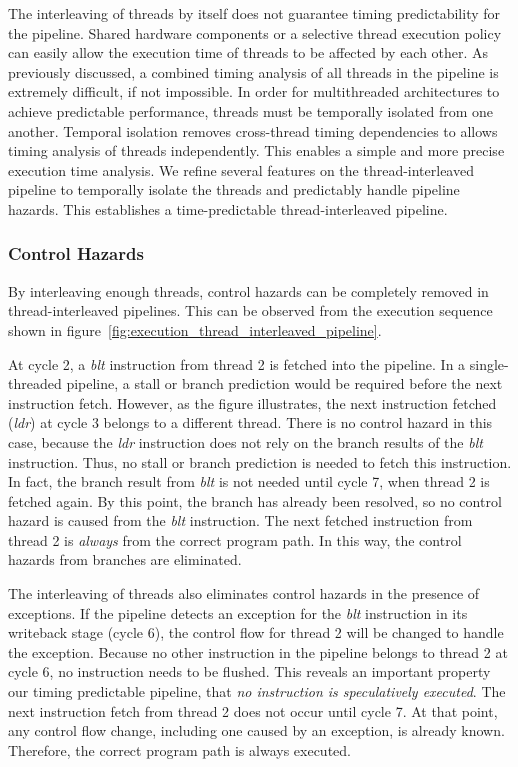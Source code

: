 The interleaving of threads by itself does not guarantee timing predictability for the pipeline.  
Shared hardware components or a selective thread execution policy can easily allow the execution time of threads to be affected by each other.    
As previously discussed, a combined timing analysis of all threads in the pipeline is extremely difficult, if not impossible.
In order for multithreaded architectures to achieve predictable performance, threads must be temporally isolated from one another. 
Temporal isolation removes cross-thread timing dependencies to allows timing analysis of threads independently.
This enables a simple and more precise execution time analysis.  
We refine several features on the thread-interleaved pipeline to temporally isolate the threads and predictably handle pipeline hazards.
This establishes a time-predictable thread-interleaved pipeline.

\subsubsection{Control Hazards}
By interleaving enough threads, control hazards can be completely removed in thread-interleaved pipelines.
This can be observed from the execution sequence shown in figure~\ref{fig:execution_thread_interleaved_pipeline}.

At cycle 2, a \emph{blt} instruction from thread 2 is fetched into the pipeline.
In a single-threaded pipeline, a stall or branch prediction would be required before the next instruction fetch.
However, as the figure illustrates, the next instruction fetched (\emph{ldr}) at cycle 3 belongs to a different thread.
There is no control hazard in this case, because the \emph{ldr} instruction does not rely on the branch results of the \emph{blt} instruction.  
Thus, no stall or branch prediction is needed to fetch this instruction.
In fact, the branch result from \emph{blt} is not needed until cycle 7, when thread 2 is fetched again.
By this point, the branch has already been resolved, so no control hazard is caused from the \emph{blt} instruction.
The next fetched instruction from thread 2 is \emph{always} from the correct program path.
In this way, the control hazards from branches are eliminated.  
  
The interleaving of threads also eliminates control hazards in the presence of exceptions.
If the pipeline detects an exception for the \emph{blt} instruction in its writeback stage (cycle 6), the control flow for thread 2 will be changed to handle the exception.  
Because no other instruction in the pipeline belongs to thread 2 at cycle 6, no instruction needs to be flushed.  
This reveals an important property our timing predictable pipeline, that \emph{no instruction is speculatively executed}.
The next instruction fetch from thread 2 does not occur until cycle 7.
At that point, any control flow change, including one caused by an exception, is already known.
Therefore, the correct program path is always executed.

